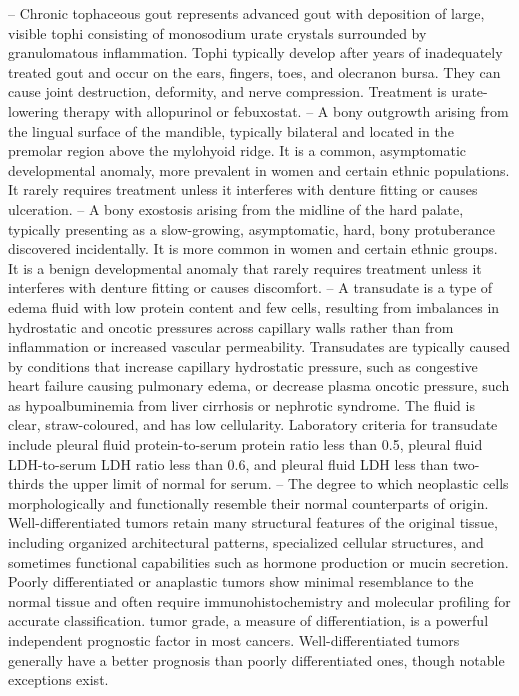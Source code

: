 -- Chronic tophaceous gout represents advanced gout with deposition of large, visible tophi consisting of monosodium urate crystals surrounded by granulomatous inflammation. Tophi typically develop after years of inadequately treated gout and occur on the ears, fingers, toes, and olecranon bursa. They can cause joint destruction, deformity, and nerve compression. Treatment is urate-lowering therapy with allopurinol or febuxostat.
-- A bony outgrowth arising from the lingual surface of the mandible, typically bilateral and located in the premolar region above the mylohyoid ridge. It is a common, asymptomatic developmental anomaly, more prevalent in women and certain ethnic populations. It rarely requires treatment unless it interferes with denture fitting or causes ulceration.
-- A bony exostosis arising from the midline of the hard palate, typically presenting as a slow-growing, asymptomatic, hard, bony protuberance discovered incidentally. It is more common in women and certain ethnic groups. It is a benign developmental anomaly that rarely requires treatment unless it interferes with denture fitting or causes discomfort.
-- A transudate is a type of edema fluid with low protein content and few cells, resulting from imbalances in hydrostatic and oncotic pressures across capillary walls rather than from inflammation or increased vascular permeability. Transudates are typically caused by conditions that increase capillary hydrostatic pressure, such as congestive heart failure causing pulmonary edema, or decrease plasma oncotic pressure, such as hypoalbuminemia from liver cirrhosis or nephrotic syndrome. The fluid is clear, straw-coloured, and has low cellularity. Laboratory criteria for transudate include pleural fluid protein-to-serum protein ratio less than 0.5, pleural fluid LDH-to-serum LDH ratio less than 0.6, and pleural fluid LDH less than two-thirds the upper limit of normal for serum.
-- The degree to which neoplastic cells morphologically and functionally resemble their normal counterparts of origin. Well-differentiated tumors retain many structural features of the original tissue, including organized architectural patterns, specialized cellular structures, and sometimes functional capabilities such as hormone production or mucin secretion. Poorly differentiated or anaplastic tumors show minimal resemblance to the normal tissue and often require immunohistochemistry and molecular profiling for accurate classification. tumor grade, a measure of differentiation, is a powerful independent prognostic factor in most cancers. Well-differentiated tumors generally have a better prognosis than poorly differentiated ones, though notable exceptions exist.
